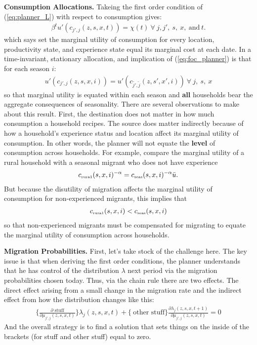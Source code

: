 \documentclass[12pt,pdftex]{article}
\begin{document}
\begin{onehalfspacing}
\textbf{Consumption Allocations.} Takeing the first order condition of (\ref{eq:planner_L}) with respect to consumption gives:
\begin{align}
\beta^{t}u'(c_{j',j}(z, s, x, t)) = \chi(t) \ \forall \ j, j', \ s, \ x, \ \mbox{and} \ t.
\label{eq:foc_planner}
\end{align}
which says set the marginal utility of consumption for every location, productivity state, and experience state equal its marginal cost at each date. In a time-invariant, stationary allocation, and implication of (\ref{eq:foc_planner}) is that for each season $i$:
\begin{align}
u'(c_{j',j}(z, s, x, i)) = u'(c_{\tilde{j'},\tilde{j}}(z, s', x', i)) \ \forall \ j, \ s, \ x
\label{eq:foc_planner2}
\end{align}
so that marginal utility is equated within each season and \textbf{all} households bear the aggregate consequences of seasonality. There are several observations to make about this result. First, the destination does not matter in how much consumption a household recipes. The source does matter indirectly because of how a household's experience status and location affect its marginal utility of consumption. In other words, the planner will not equate the \textbf{level} of consumption across households. For example, compare the marginal utility of a rural household with a seasonal migrant who does not have experience
\begin{align}
c_{\mbox{\tiny rura1}}(s, x, i)^{-\alpha} = c_{\mbox{\tiny seas}}(s, x, i)^{-\alpha}\bar u.
\end{align}
But because the disutility of migration affects the marginal utility of consumption for non-experienced migrants, this implies that
\begin{align}
c_{\mbox{\tiny rura1}}(s, x, i) < c_{\mbox{\tiny seas}}(s, x, i)
\end{align}
so that non-experienced migrants must be compensated for migrating to equate the marginal utility of consumption across households. 

\textbf{Migration Probabilities.} First, let's take stock of the challenge here. The key issue is that when deriving the first order conditions, the planner understands that he has control of the distribution $\lambda$ next period via the migration probabilities chosen today. Thus, via the chain rule there are two effects. The direct effect arising from a small change in the migration rate and the indirect effect from how the distribution changes like this:
\begin{align}
\bigg \{ \frac{\partial \mbox{ stuff}}{\partial \mu_{j',j}(z, s, x, t)} \bigg \}\lambda_{j}(z, s, x, t) + \bigg \{ \ \mbox{other \ stuff} \bigg \} \frac{\partial \lambda_{j}(z, s, x,  t+1)}{\partial \mu_{j',j}(z, s, x, t)} = 0
\label{eq:stuff}
\end{align}
And the overall strategy is to find a solution that sets things on the inside of the brackets (for stuff and other stuff) equal to zero.


\end{onehalfspacing}
\end{document}
